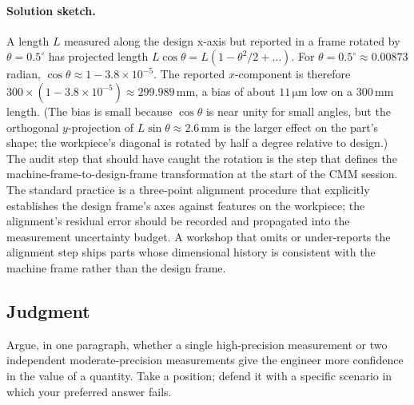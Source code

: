 \paragraph{Solution sketch.}
A length $L$ measured along the design x-axis but reported in a
frame rotated by $\theta = 0.5^{\circ}$ has projected
length $L \cos\theta = L (1 - \theta^{2}/2 + \ldots)$. For
$\theta = 0.5^{\circ} \approx 0.00873$ radian, $\cos\theta \approx
1 - 3.8 \times 10^{-5}$. The reported $x$-component is therefore
$300 \times (1 - 3.8 \times 10^{-5}) \approx 299.989 \,\si
{\milli\meter}$, a bias of about $11 \,\si{\micro\meter}$ low on
a $300 \,\si{\milli\meter}$ length. (The bias is small because
$\cos\theta$ is near unity for small angles, but the orthogonal
$y$-projection of $L \sin\theta \approx 2.6 \,\si{\milli\meter}$
is the larger effect on the part's shape; the workpiece's
diagonal is rotated by half a degree relative to design.) The
audit step that should have caught the rotation is the
 step that defines the
machine-frame-to-design-frame transformation at the start of the
CMM session. The standard practice is a three-point alignment
procedure that explicitly establishes the design frame's axes
against features on the workpiece; the alignment's residual error
should be recorded and propagated into the measurement uncertainty
budget. A workshop that omits or under-reports the alignment step
ships parts whose dimensional history is consistent with the
machine frame rather than the design frame.

\subsection*{Judgment}

\begin{exercise}
Argue, in one paragraph, whether a single high-precision measurement
or two independent moderate-precision measurements give the engineer
more confidence in the value of a quantity. Take a position; defend
it with a specific scenario in which your preferred answer fails.
\end{exercise}


